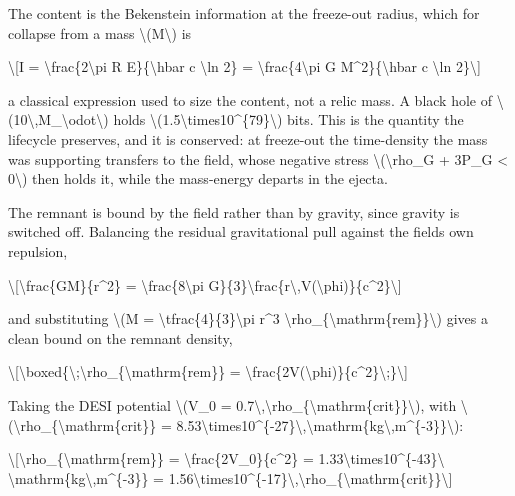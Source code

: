 \documentclass[
  10pt,
]{article}
\begin{document}
The content is the Bekenstein information at the freeze-out radius,
which for collapse from a mass \textbackslash(M\textbackslash) is

\textbackslash{[}I = \textbackslash frac\{2\textbackslash pi R
E\}\{\textbackslash hbar c \textbackslash ln 2\} =
\textbackslash frac\{4\textbackslash pi G M\^{}2\}\{\textbackslash hbar
c \textbackslash ln 2\}\textbackslash{]}

a classical expression used to size the content, not a relic mass. A
black hole of
\textbackslash(10\textbackslash,M\_\textbackslash odot\textbackslash)
holds \textbackslash(1.5\textbackslash times10\^{}\{79\}\textbackslash)
bits. This is the quantity the lifecycle preserves, and it is conserved:
at freeze-out the time-density the mass was supporting transfers to the
field, whose negative stress \textbackslash(\textbackslash rho\_G +
3P\_G \textless{} 0\textbackslash) then holds it, while the mass-energy
departs in the ejecta.

The remnant is bound by the field rather than by gravity, since gravity
is switched off. Balancing the residual gravitational pull against the
field\textquotesingle s own repulsion,

\textbackslash{[}\textbackslash frac\{GM\}\{r\^{}2\} =
\textbackslash frac\{8\textbackslash pi
G\}\{3\}\textbackslash frac\{r\textbackslash,V(\textbackslash phi)\}\{c\^{}2\}\textbackslash{]}

and substituting \textbackslash(M =
\textbackslash tfrac\{4\}\{3\}\textbackslash pi r\^{}3
\textbackslash rho\_\{\textbackslash mathrm\{rem\}\}\textbackslash)
gives a clean bound on the remnant density,

\textbackslash{[}\textbackslash boxed\{\textbackslash;\textbackslash rho\_\{\textbackslash mathrm\{rem\}\}
=
\textbackslash frac\{2V(\textbackslash phi)\}\{c\^{}2\}\textbackslash;\}\textbackslash{]}

Taking the DESI potential \textbackslash(V\_0 =
0.7\textbackslash,\textbackslash rho\_\{\textbackslash mathrm\{crit\}\}\textbackslash),
with
\textbackslash(\textbackslash rho\_\{\textbackslash mathrm\{crit\}\} =
8.53\textbackslash times10\^{}\{-27\}\textbackslash,\textbackslash mathrm\{kg\textbackslash,m\^{}\{-3\}\}\textbackslash):

\textbackslash{[}\textbackslash rho\_\{\textbackslash mathrm\{rem\}\} =
\textbackslash frac\{2V\_0\}\{c\^{}2\} =
1.33\textbackslash times10\^{}\{-43\}\textbackslash{}
\textbackslash mathrm\{kg\textbackslash,m\^{}\{-3\}\} =
1.56\textbackslash times10\^{}\{-17\}\textbackslash,\textbackslash rho\_\{\textbackslash mathrm\{crit\}\}\textbackslash{]}
\end{document}
